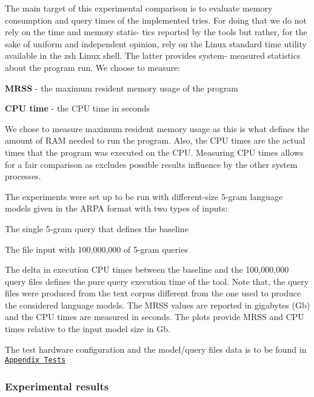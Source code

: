 The main target of this experimental comparison is to evaluate memory consumption and query times of the implemented tries. For doing that we do not rely on the time and memory statis-\/ tics reported by the tools but rather, for the sake of uniform and independent opinion, rely on the Linux standard time utility available in the {\ttfamily zsh} Linux shell. The latter provides system-\/ measured statistics about the program run. We choose to measure\+:


\begin{DoxyItemize}
\item {\bfseries M\+R\+S\+S} -\/ the maximum resident memory usage of the program
\item {\bfseries C\+P\+U time} -\/ the C\+P\+U time in seconds
\end{DoxyItemize}

We chose to measure maximum resident memory usage as this is what defines the amount of R\+A\+M needed to run the program. Also, the C\+P\+U times are the actual times that the program was executed on the C\+P\+U. Measuring C\+P\+U times allows for a fair comparison as excludes possible results influence by the other system processes.

The experiments were set up to be run with different-\/size 5-\/gram language models given in the A\+R\+P\+A format with two types of inputs\+:


\begin{DoxyEnumerate}
\item The single 5-\/gram query that defines the baseline
\item The file input with 100,000,000 of 5-\/gram queries
\end{DoxyEnumerate}

The delta in execution C\+P\+U times between the baseline and the 100,000,000 query files defines the pure query execution time of the tool. Note that, the query files were produced from the text corpus different from the one used to produce the considered language models. The M\+R\+S\+S values are reported in gigabytes (Gb) and the C\+P\+U times are measured in seconds. The plots provide M\+R\+S\+S and C\+P\+U times relative to the input model size in Gb.

The test hardware configuration and the model/query files\textquotesingle{} data is to be found in \href{#appendix-tests}{\tt Appendix Tests}

\subsubsection*{Experimental results}


